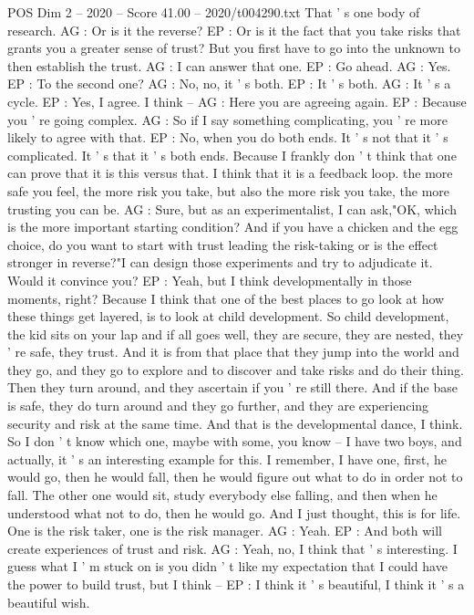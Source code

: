 \begin{textsample}{POS Dim 2 – 2020 – Score 41.00 – 2020/t004290.txt}
That ' s one body of research.
AG : Or is it the reverse?
EP : Or is it the fact that you take risks that grants you a greater sense of trust?
But you first have to go into the unknown to then establish the trust.
AG : I can answer that one.
EP : Go ahead.
AG : Yes.
EP : To the second one?
AG : No, no, it ' s both.
EP : It ' s both.
AG : It ' s a cycle.
EP : Yes, I agree.
I think -- AG : Here you are agreeing again.
EP : Because you ' re going complex.
AG : So if I say something complicating, you ' re more likely to agree with that.
EP : No, when you do both ends.
It ' s not that it ' s complicated.
It ' s that it ' s both ends.
Because I frankly don ' t think that one can prove that it is this versus that.
I think that it is a feedback loop. the more safe you feel, the more risk you take, but also the more risk you take, the more trusting you can be.
AG : Sure, but as an experimentalist, I can ask,"OK, which is the more important starting condition?
And if you have a chicken and the egg choice, do you want to start with trust leading the risk-taking or is the effect stronger in reverse?"I can design those experiments and try to adjudicate it.
Would it convince you?
EP : Yeah, but I think developmentally in those moments, right?
Because I think that one of the best places to go look at how these things get layered, is to look at child development.
So child development, the kid sits on your lap and if all goes well, they are secure, they are nested, they ' re safe, they trust.
And it is from that place that they jump into the world and they go, and they go to explore and to discover and take risks and do their thing.
Then they turn around, and they ascertain if you ' re still there.
And if the base is safe, they do turn around and they go further, and they are experiencing security and risk at the same time.
And that is the developmental dance, I think.
So I don ' t know which one, maybe with some, you know -- I have two boys, and actually, it ' s an interesting example for this.
I remember, I have one, first, he would go, then he would fall, then he would figure out what to do in order not to fall.
The other one would sit, study everybody else falling, and then when he understood what not to do, then he would go.
And I just thought, this is for life.
One is the risk taker, one is the risk manager.
AG : Yeah.
EP : And both will create experiences of trust and risk.
AG : Yeah, no, I think that ' s interesting.
I guess what I ' m stuck on is you didn ' t like my expectation that I could have the power to build trust, but I think -- EP : I think it ' s beautiful, I think it ' s a beautiful wish.

\end{textsample}
